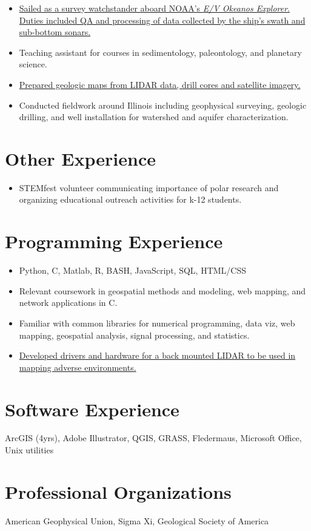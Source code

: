 \documentclass{cv_TOH}
\begin{document}
\begin{itemize}
\item \href{http://www.niutoday.info/2014/04/17/niu-student-lands-coveted-internship-aboard-exploration-ship/}{Sailed as a survey watchstander aboard NOAA's \textit{E/V Okeanos Explorer}. Duties included QA and processing of data collected by the ship's swath and sub-bottom sonars.}
\end{itemize}

\begin{itemize}
\item Teaching assistant for courses in sedimentology, paleontology, and planetary science.
\end{itemize}

\begin{itemize}
\item \href{http://www.isgs.illinois.edu/sites/isgs/files/maps/isgs-quads/aurora-south-sg.pdf}{Prepared geologic maps from LIDAR data, drill cores and satellite imagery.}
\item Conducted fieldwork around Illinois including geophysical surveying, geologic drilling, and well installation for watershed and aquifer characterization. 
\end{itemize}

\section{Other Experience}
\begin{itemize}
\item STEMfest volunteer communicating importance of polar research and organizing educational outreach activities for k-12 students.
\end{itemize}

\section{Programming Experience}
\begin{itemize}
\item Python, C, Matlab, R, BASH, JavaScript, SQL, HTML/CSS
\item Relevant coursework in geospatial methods and modeling, web mapping, and network applications in C.
\item Familiar with common libraries for numerical programming, data viz, web mapping, geospatial analysis, signal processing, and statistics.
\item \href{https://github.com/tohodson/velodyne_tools}{Developed drivers and hardware for a back mounted LIDAR to be used in mapping adverse environments.}
\end{itemize}

\section{Software Experience}
ArcGIS (4yrs), Adobe Illustrator, QGIS, GRASS, Fledermaus, Microsoft Office, Unix utilities

\section{Professional Organizations}
American Geophysical Union, Sigma Xi, Geological Society of America
\end{document}
